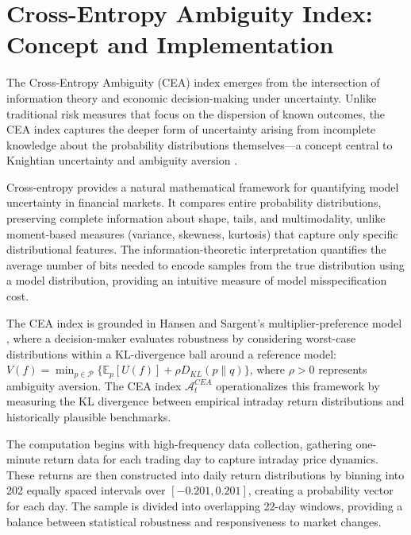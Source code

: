 \documentclass[preprint,12pt,authoryear]{elsarticle}
\begin{document}
\clearpage
\appendix

\section{Cross-Entropy Ambiguity Index: Concept and Implementation}

The Cross-Entropy Ambiguity (CEA) index emerges from the intersection of information theory and economic decision-making under uncertainty. Unlike traditional risk measures that focus on the dispersion of known outcomes, the CEA index captures the deeper form of uncertainty arising from incomplete knowledge about the probability distributions themselves—a concept central to Knightian uncertainty \cite{knight1921} and ambiguity aversion \cite{ellsberg1961}.

Cross-entropy provides a natural mathematical framework for quantifying model uncertainty in financial markets. It compares entire probability distributions, preserving complete information about shape, tails, and multimodality, unlike moment-based measures (variance, skewness, kurtosis) that capture only specific distributional features. The information-theoretic interpretation quantifies the average number of bits needed to encode samples from the true distribution using a model distribution, providing an intuitive measure of model misspecification cost.

The CEA index is grounded in Hansen and Sargent's multiplier-preference model \cite{hansen2001}, where a decision-maker evaluates robustness by considering worst-case distributions within a KL-divergence ball around a reference model: $V(f) = \min_{p \in \mathcal{P}} \{\mathbb{E}_p[U(f)] + \rho D_{KL}(p\|q)\}$, where $\rho > 0$ represents ambiguity aversion. The CEA index $\mathcal{A}^{CEA}_t$ operationalizes this framework by measuring the KL divergence between empirical intraday return distributions and historically plausible benchmarks.


The computation begins with high-frequency data collection, gathering one-minute return data for each trading day to capture intraday price dynamics. These returns are then constructed into daily return distributions by binning into 202 equally spaced intervals over $[-0.201, 0.201]$, creating a probability vector for each day. The sample is divided into overlapping 22-day windows, providing a balance between statistical robustness and responsiveness to market changes.
\end{document}

